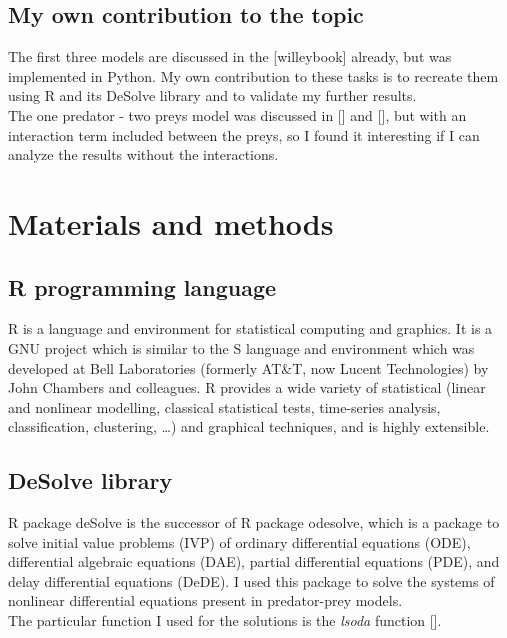 \documentclass[]{article}
\begin{document}
\subsection{My own contribution to the
topic}\label{my-own-contribution-to-the-topic}

The first three models are discussed in the {[}willeybook{]} already,
but was implemented in Python. My own contribution to these tasks is to
recreate them using R and its DeSolve library and to validate my further
results.\\
The one predator - two preys model was discussed in {[}{]} and {[}{]},
but with an interaction term included between the preys, so I found it
interesting if I can analyze the results without the interactions.

\section{Materials and methods}\label{materials-and-methods}

\subsection{R programming language}\label{r-programming-language}

R is a language and environment for statistical computing and graphics.
It is a GNU project which is similar to the S language and environment
which was developed at Bell Laboratories (formerly AT\&T, now Lucent
Technologies) by John Chambers and colleagues. R provides a wide variety
of statistical (linear and nonlinear modelling, classical statistical
tests, time-series analysis, classification, clustering, \ldots{}) and
graphical techniques, and is highly extensible.

\subsection{DeSolve library}\label{desolve-library}

R package deSolve is the successor of R package odesolve, which is a
package to solve initial value problems (IVP) of ordinary differential
equations (ODE), differential algebraic equations (DAE), partial
differential equations (PDE), and delay differential equations (DeDE). I
used this package to solve the systems of nonlinear differential
equations present in predator-prey models.\\
The particular function I used for the solutions is the \emph{lsoda}
function {[}{]}.
\end{document}
